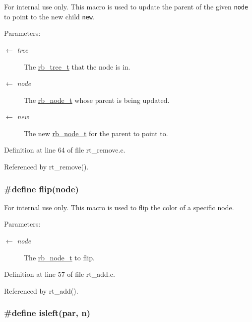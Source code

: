 \begin{Desc}
\item[For internal use only.]
This macro is used to update the parent of the given {\tt node} to point to the new child {\tt new}.

\begin{Desc}
\item[Parameters:]
\begin{description}
\item[\mbox{$\leftarrow$} {\em tree}]The \hyperlink{group__dbprim__rbtree_ga0}{rb\_\-tree\_\-t} that the node is in. \item[\mbox{$\leftarrow$} {\em node}]The \hyperlink{group__dbprim__rbtree_ga1}{rb\_\-node\_\-t} whose parent is being updated. \item[\mbox{$\leftarrow$} {\em new}]The new \hyperlink{group__dbprim__rbtree_ga1}{rb\_\-node\_\-t} for the parent to point to.\end{description}
\end{Desc}
\end{Desc}


Definition at line 64 of file rt\_\-remove.c.

Referenced by rt\_\-remove().\hypertarget{group__dbprim__rbtree_ga44}{
\subsubsection[flip]{\setlength{\rightskip}{0pt plus 5cm}\#define flip(node)}}
\label{group__dbprim__rbtree_ga44}


\begin{Desc}
\item[For internal use only.]
This macro is used to flip the color of a specific node.

\begin{Desc}
\item[Parameters:]
\begin{description}
\item[\mbox{$\leftarrow$} {\em node}]The \hyperlink{group__dbprim__rbtree_ga1}{rb\_\-node\_\-t} to flip.\end{description}
\end{Desc}
\end{Desc}


Definition at line 57 of file rt\_\-add.c.

Referenced by rt\_\-add().\hypertarget{group__dbprim__rbtree_ga47}{
\subsubsection[isleft]{\setlength{\rightskip}{0pt plus 5cm}\#define isleft(par, n)}}
\label{group__dbprim__rbtree_ga47}



